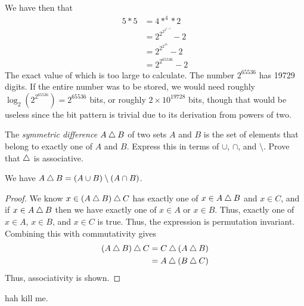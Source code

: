 \documentclass[12pt]{article}
\begin{document}
We have then that
\begin{align*}
    5 * 5 &= 4 *^{4} * 2\\
          &= 2^{2^{2^{2^{2+2}}}} - 2\\
          &= 2^{2^{2^{16}}} - 2\\
          &= 2^{2^{65536}} - 2
\end{align*}
The exact value of which is too large to calculate.
The number $2^{65536}$ has 19729 digits.
If the entire number was to be stored,
we would need roughly $\log_2(2^{2^{65536}}) = 2^{65536}$ bits,
or roughly $2 \times 10^{19728}$ bits,
though that would be useless since the bit pattern
is trivial due to its derivation from powers of two.

\begin{question}
    The \emph{symmetric difference} $A \mathbin{\triangle} B$ of two sets $A$ and $B$
    is the set of elements that belong to exactly one of $A$ and $B$.
    Express this in terms of $\cup$, $\cap$, and $\setminus$.
    Prove that $\mathbin{\triangle}$ is associative.
\end{question}

We have $A \mathbin{\triangle} B = (A \cup B) \setminus (A \cap B)$.

\begin{proof}
    We know $x \in (A \mathbin{\triangle} B) \mathbin{\triangle} C$ has
    exactly one of $x \in A \mathbin{\triangle} B$ and $x \in C$,
    and if $x \in A \mathbin{\triangle} B$ then we have
    exactly one of $x \in A$ or $x \in B$.
    Thus, exactly one of $x \in A$, $x \in B$, and $x \in C$ is true.
    Thus, the expression is permutation invariant.
    Combining this with commutativity gives
    \begin{align*}
        (A \mathbin{\triangle} B) \mathbin{\triangle} C &= C \mathbin{\triangle} (A \mathbin{\triangle} B)\\
                                  &= A \mathbin{\triangle} (B \mathbin{\triangle} C)
    \end{align*}
    Thus, associativity is shown.
\end{proof}

\begin{question}
    hah kill me.
\end{question}
\end{document}

